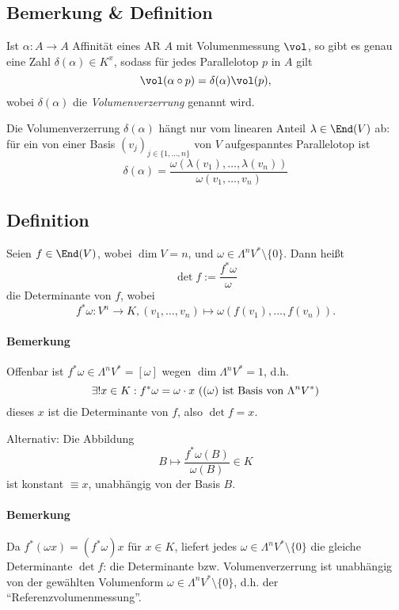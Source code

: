 \subsection{Bemerkung \& Definition}
	\begin{Definition}[Volumenverzerrung]
		Ist $ \alpha: A\to A $ Affinität eines AR $ A $ mit Volumenmessung $ \vol $, so gibt es genau eine Zahl $ \delta(\alpha)\in K^x $, sodass für jedes Parallelotop $ p $ in $ A $ gilt
			\[ \vol(\alpha\circ p) = \delta(\alpha)\vol(p), \]
		wobei $ \delta(\alpha) $ die \emph{Volumenverzerrung} genannt wird.
		
		Die Volumenverzerrung $ \delta(\alpha) $ hängt nur vom linearen Anteil $ \lambda\in \End(V) $ ab: für ein von einer Basis $ (v_j)_{j\in \{1,\dots,n\}} $ von $ V $ aufgespanntes Parallelotop ist
			\[ \delta(\alpha) = \frac{\omega(\lambda(v_1),\dots,\lambda(v_n))}{\omega(v_1,\dots,v_n)} \]
	\end{Definition}
\subsection{Definition}
	\begin{Definition}
		Seien $ f\in\End(V) $, wobei $ \dim V=n $, und $ \omega\in \Lambda^nV^*\setminus \{0\} $. Dann heißt
		\[ \det f:= \frac{f^*\omega}{\omega} \]
	die Determinante von $ f $, wobei
		\[ f^*\omega: V^n\to K, (v_1,\dots,v_n)\mapsto \omega(f(v_1),\dots,f(v_n)). \]
	\end{Definition}
\paragraph{Bemerkung}
	Offenbar ist $ f^*\omega\in \Lambda^nV^* = [\omega] $ wegen $ \dim \Lambda^nV^*=1 $, d.h.
		\[ \exists! x\in K: f^*\omega = \omega \cdot x \text{ ($(\omega) $ ist Basis von $ \Lambda^nV^* $)} \]
	dieses $ x $ ist die Determinante von $ f $, also $ \det f = x $.
	
	Alternativ: Die Abbildung
		\[ B\mapsto  \frac{f^*\omega(B)}{\omega(B)}\in K\]
	ist konstant $ \equiv x $, unabhängig von der Basis $ B $.
\paragraph{Bemerkung}
	Da $ f^*(\omega x) = (f^*\omega)x $ für $ x\in K $, liefert jedes $ \omega \in \Lambda^nV^*\setminus\{0\} $ die gleiche Determinante $ \det f $: die Determinante bzw. Volumenverzerrung ist unabhängig von der gewählten Volumenform $ \omega\in \Lambda^nV^*\setminus \{0\} $, d.h. der "`Referenzvolumenmessung"'.
